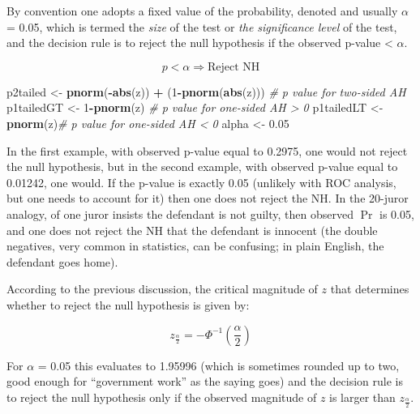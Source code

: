 \documentclass[
]{book}
\newenvironment{Shaded}{\begin{snugshade}}{\end{snugshade}}
\newcommand{\CommentTok}[1]{\textcolor[rgb]{0.56,0.35,0.01}{\textit{#1}}}
\newcommand{\DecValTok}[1]{\textcolor[rgb]{0.00,0.00,0.81}{#1}}
\newcommand{\FloatTok}[1]{\textcolor[rgb]{0.00,0.00,0.81}{#1}}
\newcommand{\KeywordTok}[1]{\textcolor[rgb]{0.13,0.29,0.53}{\textbf{#1}}}
\newcommand{\NormalTok}[1]{#1}
\newcommand{\OperatorTok}[1]{\textcolor[rgb]{0.81,0.36,0.00}{\textbf{#1}}}
\newcommand{\StringTok}[1]{\textcolor[rgb]{0.31,0.60,0.02}{#1}}
\begin{document}
By convention one adopts a fixed value of the probability, denoted and usually \(\alpha\) = 0.05, which is termed the \emph{size} of the test or \emph{the significance level} of the test, and the decision rule is to reject the null hypothesis if the observed p-value \textless{} \(\alpha\).

\begin{equation*} 
p < \alpha \Rightarrow \text{Reject NH}
\end{equation*}

\begin{Shaded}
\begin{Highlighting}[]
\NormalTok{p2tailed \textless{}{-}}\StringTok{ }\KeywordTok{pnorm}\NormalTok{(}\OperatorTok{{-}}\KeywordTok{abs}\NormalTok{(z)) }\OperatorTok{+}\StringTok{ }\NormalTok{(}\DecValTok{1}\OperatorTok{{-}}\KeywordTok{pnorm}\NormalTok{(}\KeywordTok{abs}\NormalTok{(z))) }\CommentTok{\# p value for two{-}sided AH}
\NormalTok{p1tailedGT \textless{}{-}}\StringTok{ }\DecValTok{1}\OperatorTok{{-}}\KeywordTok{pnorm}\NormalTok{(z) }\CommentTok{\# p value for one{-}sided AH \textgreater{} 0 }
\NormalTok{p1tailedLT \textless{}{-}}\StringTok{ }\KeywordTok{pnorm}\NormalTok{(z)}\CommentTok{\# p value for one{-}sided AH \textless{} 0 }
\NormalTok{alpha  \textless{}{-}}\StringTok{ }\FloatTok{0.05}
\end{Highlighting}
\end{Shaded}

In the first example, with observed p-value equal to 0.2975, one would not reject the null hypothesis, but in the second example, with observed p-value equal to 0.01242, one would. If the p-value is exactly 0.05 (unlikely with ROC analysis, but one needs to account for it) then one does not reject the NH. In the 20-juror analogy, of one juror insists the defendant is not guilty, then observed \(\Pr\) is 0.05, and one does not reject the NH that the defendant is innocent (the double negatives, very common in statistics, can be confusing; in plain English, the defendant goes home).

According to the previous discussion, the critical magnitude of \(z\) that determines whether to reject the null hypothesis is given by:

\begin{equation*} 
z_\frac{\alpha}{2}=-\Phi^{-1}\left ( \frac{\alpha}{2} \right )
\end{equation*}

For \(\alpha\) = 0.05 this evaluates to 1.95996 (which is sometimes rounded up to two, good enough for ``government work'' as the saying goes) and the decision rule is to reject the null hypothesis only if the observed magnitude of \(z\) is larger than \(z_\frac{\alpha}{2}\).
\end{document}
